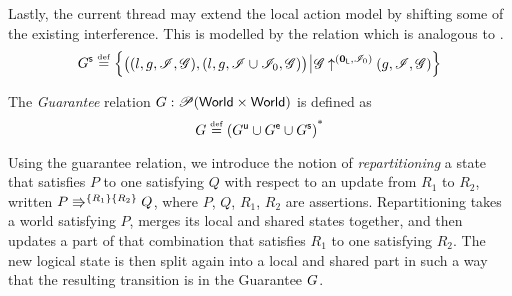 
Lastly, the current thread may extend the local action model by
shifting some of the existing interference. This is modelled by the
\shiftG relation which is analogous to \shiftR.
\[
\shiftG \eqdef
\left\{
\begin{array}{@{} l @{\hspace*{2pt}} | @{\hspace*{2pt}} r @{}}
  \left(
  \begin{array}{@{} l @{}}
    (l, g, \lmod, \gmod),
    \left( l, g, \lmod \cup \lmod_0, \gmod  \right)
  \end{array}
  \right)
  &
  \expandsAM{\gmod}{\unitL}{\lmod_0}{g}{\lmod}{\gmod}
\end{array}
\right\}
\]

\begin{definition}[Guarantee]
The \emph{Guarantee} relation $\guarantee: \powerset (\Worlds \times \Worlds)$ is defined as
\[
\guarantee \eqdef  \left( \updateG \cup \extendG \cup \shiftG \right)^{\text{*}}
\]
\end{definition}

Using the guarantee relation, we introduce the notion of
\emph{repartitioning} a state that satisfies $P$ to one satisfying $Q$
with respect to an update from $R_1$ to $R_2$, written
$\repartitions{P}{Q}{R_1}{R_2}$, where $P$, $Q$, $R_1$, $R_2$ are
assertions. Repartitioning takes a world satisfying $P$, merges its
local and shared states together, and then updates a part of that
combination that satisfies $R_1$ to one satisfying $R_2$. The new
logical state is then split again into a local and shared part in such
a way that the resulting transition is in the Guarantee $\guarantee$.

